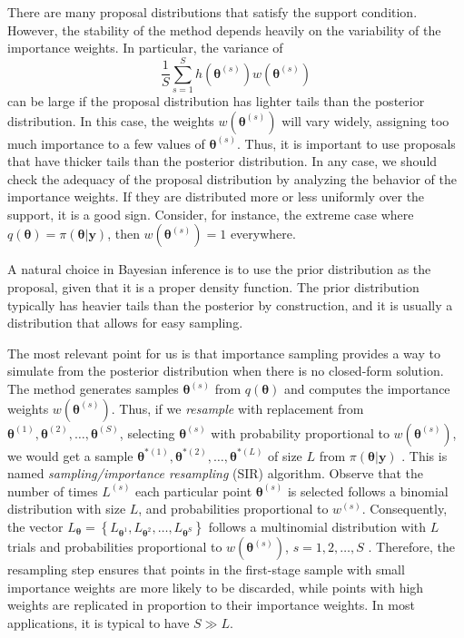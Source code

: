 There are many proposal distributions that satisfy the support condition. However, the stability of the method depends heavily on the variability of the importance weights. In particular, the variance of  
\[
\frac{1}{S}\sum_{s=1}^S h(\bm{\theta}^{(s)})w(\bm{\theta}^{(s)})
\]  
can be large if the proposal distribution has lighter tails than the posterior distribution. In this case, the weights \( w(\bm{\theta}^{(s)}) \) will vary widely, assigning too much importance to a few values of \( \bm{\theta}^{(s)} \). Thus, it is important to use proposals that have thicker tails than the posterior distribution. In any case, we should check the adequacy of the proposal distribution by analyzing the behavior of the importance weights. If they are distributed more or less uniformly over the support, it is a good sign. Consider, for instance, the extreme case where $q(\bm{\theta}) = \pi(\bm{\theta}|\bm{y})$, then $w(\bm{\theta}^{(s)}) = 1$ everywhere. 

A natural choice in Bayesian inference is to use the prior distribution as the proposal, given that it is a proper density function. The prior distribution typically has heavier tails than the posterior by construction, and it is usually a distribution that allows for easy sampling.

The most relevant point for us is that importance sampling provides a way to simulate from the posterior distribution when there is no closed-form solution. The method generates samples $\bm{\theta}^{(s)}$ from $q(\bm{\theta})$ and computes the importance weights $w(\bm{\theta}^{(s)})$. Thus, if we \textit{resample} with replacement from $\bm{\theta}^{(1)},\bm{\theta}^{(2)},\dots,\bm{\theta}^{(S)}$, selecting $\bm{\theta}^{(s)}$ with probability proportional to  $w(\bm{\theta}^{(s)})$, we would get a sample $\bm{\theta}^{*(1)},\bm{\theta}^{*(2)},\dots,\bm{\theta}^{*(L)}$ of size $L$ from $\pi(\bm{\theta}|\bm{y})$ \cite{smith1992bayesian,rubin1988sir}. This is named \textit{sampling/importance resampling} (SIR) algorithm. Observe that the number of times $L^{(s)}$ each particular point $\bm{\theta}^{(s)}$ is selected follows a binomial distribution with size $L$, and probabilities proportional to $w^{(s)}$. Consequently, the vector $L_{\bm{\theta}} = \left\{L_{\bm{\theta}^1}, L_{\bm{\theta}^2}, \dots, L_{\bm{\theta}^S}\right\}$ follows a multinomial distribution with $L$ trials and probabilities proportional to $w(\bm{\theta}^{(s)})$, $s = 1, 2, \dots, S$ \cite{cappe2007overview}. Therefore, the resampling step ensures that points in the first-stage sample with small importance weights are more likely to be discarded, while points with high weights are replicated in proportion to their importance weights. In most applications, it is typical to have $S \gg L$.

